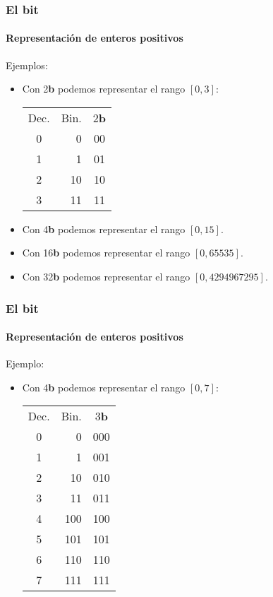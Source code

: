 \documentclass[11pt,a4paper,spanish]{beamer}
\newcommand{\bit}{\textbf{b}}
\begin{document}
\begin{frame}

\frametitle{El bit}
\framesubtitle{Representación de enteros positivos}

    Ejemplos:
    \begin{itemize}
        \item Con 2\bit{} podemos representar el rango $[0,3]$:
        \begin{tabular}{c r c}
            Dec. & {\centering Bin.} & 2\bit\\
            0 & 0 & 00\\ \hline
            1 & 1 & 01\\ \hline
            2 & 10 & 10\\ \hline
            3 & 11 & 11\\
        \end{tabular}\pause
    \item Con 4\bit{} podemos representar el rango $[0,15]$.
    \item Con 16\bit{} podemos representar el rango $[0,65535]$.
    \item Con 32\bit{} podemos representar el rango $[0,4294967295]$.
    \end{itemize}

\end{frame}

\begin{frame}

\frametitle{El bit}
\framesubtitle{Representación de enteros positivos}

    Ejemplo:
    \begin{itemize}
        \item Con 4\bit{} podemos representar el rango $[0,7]$:
        \begin{tabular}{c r c}
            Dec. & {\centering Bin.} & 3\bit\\
            0 &   0 & 000\\ \hline
            1 &   1 & 001\\ \hline
            2 &  10 & 010\\ \hline
            3 &  11 & 011\\ \hline
            4 & 100 & 100\\ \hline
            5 & 101 & 101\\ \hline
            6 & 110 & 110\\ \hline
            7 & 111 & 111\\
        \end{tabular}
    \end{itemize}

\end{frame}
\end{document}
